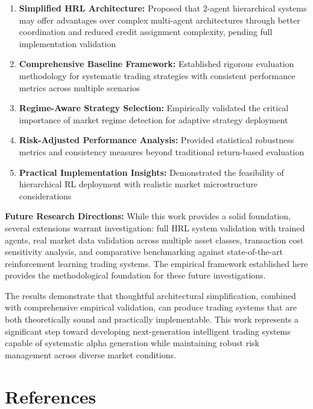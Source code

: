 \documentclass[11pt,a4paper]{article}
\begin{document}
\begin{enumerate}
\item \textbf{Simplified HRL Architecture:} Proposed that 2-agent hierarchical systems may offer advantages over complex multi-agent architectures through better coordination and reduced credit assignment complexity, pending full implementation validation
\item \textbf{Comprehensive Baseline Framework:} Established rigorous evaluation methodology for systematic trading strategies with consistent performance metrics across multiple scenarios
\item \textbf{Regime-Aware Strategy Selection:} Empirically validated the critical importance of market regime detection for adaptive strategy deployment
\item \textbf{Risk-Adjusted Performance Analysis:} Provided statistical robustness metrics and consistency measures beyond traditional return-based evaluation
\item \textbf{Practical Implementation Insights:} Demonstrated the feasibility of hierarchical RL deployment with realistic market microstructure considerations

\end{enumerate}
\textbf{Future Research Directions:}
While this work provides a solid foundation, several extensions warrant investigation: full HRL system validation with trained agents, real market data validation across multiple asset classes, transaction cost sensitivity analysis, and comparative benchmarking against state-of-the-art reinforcement learning trading systems. The empirical framework established here provides the methodological foundation for these future investigations.

The results demonstrate that thoughtful architectural simplification, combined with comprehensive empirical validation, can produce trading systems that are both theoretically sound and practically implementable. This work represents a significant step toward developing next-generation intelligent trading systems capable of systematic alpha generation while maintaining robust risk management across diverse market conditions.

\section{References}
\end{document}

